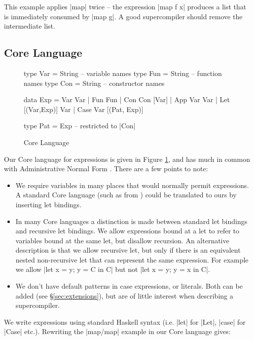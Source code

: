 \documentclass[draft]{sigplanconf}
\begin{document}
This example applies |map| twice -- the expression |map f x| produces a list that is immediately consumed by |map g|. A good supercompiler should remove the intermediate list.

\subsection{Core Language}
\label{sec:core}

\begin{figure}
\begin{code}
type Var   =   String -- variable names
type Fun   =   String -- function names
type Con   =   String -- constructor names

data Exp   =   Var Var
           |   Fun Fun
           |   Con Con [Var]
           |   App Var Var
           |   Let [(Var,Exp)] Var
           |   Case Var [(Pat, Exp)]

type Pat   =   Exp -- restricted to |Con|
\end{code}
\caption{Core Language}
\label{fig:core}
\end{figure}

Our Core language for expressions is given in Figure \ref{fig:core}, and has much in common with Administrative Normal Form \cite{flanagan:continuations}. There are a few points to note:

\begin{itemize}
\item We require variables in many places that would normally permit expressions. A standard Core language (such as from \citet{ghc_core}) could be translated to ours by inserting let bindings.
\item In many Core languages a distinction is made between standard let bindings and recursive let bindings. We allow expressions bound at a let to refer to variables bound at the same let, but disallow recursion. An alternative description is that we allow recursive let, but only if there is an equivalent nested non-recursive let that can represent the same expression. For example we allow |let x = y; y = C in C| but not |let x = y; y = x in C|.
\item We don't have default patterns in case expressions, or literals. Both can be added (see \S\ref{sec:extensions}), but are of little interest when describing a supercompiler.
\end{itemize}

We write expressions using standard Haskell syntax (i.e. |let| for |Let|, |case| for |Case| etc.). Rewriting the |map/map| example in our Core language gives:
\end{document}
